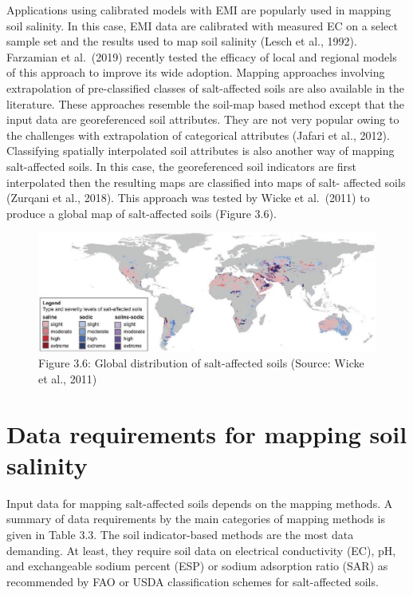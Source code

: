 \documentclass[
  10pt,
  b5paper,
]{book}
\begin{document}
Applications using calibrated models with EMI are popularly used in mapping soil salinity. In this case, EMI data are calibrated with measured EC on a select sample set and the results used to map soil salinity (Lesch et al., 1992). Farzamian et al.~(2019) recently tested the efficacy of local and regional models of this approach to improve its wide adoption. Mapping approaches involving extrapolation of pre-classified classes of salt-affected soils are also available in the literature. These approaches resemble the soil-map based method except that the input data are georeferenced soil attributes. They are not very popular owing to the challenges with extrapolation of categorical attributes (Jafari et al., 2012). Classifying spatially interpolated soil attributes is also another way of mapping salt-affected soils. In this case, the georeferenced soil indicators are first interpolated then the resulting maps are classified into maps of salt- affected soils (Zurqani et al., 2018). This approach was tested by Wicke et al.~(2011) to produce a global map of salt-affected soils (Figure 3.6).

\begin{figure}
\centering
\includegraphics{figures/images/Figure3.6.jpg}
\caption{Figure 3.6: Global distribution of salt-affected soils (Source: Wicke et al., 2011)}
\end{figure}

\hypertarget{data-requirements-for-mapping-soil-salinity}{%
\section{Data requirements for mapping soil salinity}\label{data-requirements-for-mapping-soil-salinity}}

Input data for mapping salt-affected soils depends on the mapping methods. A summary of data requirements by the main categories of mapping methods is given in Table 3.3. The soil indicator-based methods are the most data demanding. At least, they require soil data on electrical conductivity (EC), pH, and exchangeable sodium percent (ESP) or sodium adsorption ratio (SAR) as recommended by FAO or USDA classification schemes for salt-affected soils.
\end{document}
